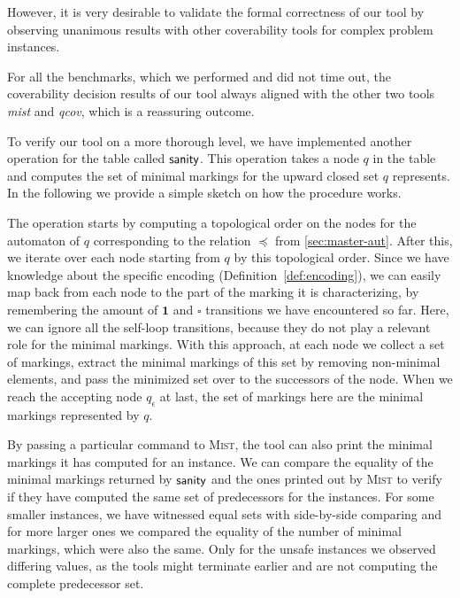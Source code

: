 However, it is very desirable to validate the formal correctness of our tool by observing unanimous results with other coverability tools for complex problem instances.

For all the benchmarks, which we performed and did not time out, the coverability decision results of our tool always aligned with the other two tools \textit{mist} and \textit{qcov}, which is a reassuring outcome. 

To verify our tool on a more thorough level, we have implemented another operation for the table called $\operatorname{\textsf{sanity}}$. This operation takes a node $q$ in the table and computes the set of minimal markings for the upward closed set $q$ represents. In the following we provide a simple sketch on how the procedure works.

The operation starts by computing a topological order on the nodes for the automaton of $q$ corresponding to the relation $\preceq$ from \autoref{sec:master-aut}. After this, we iterate over each node starting from $q$ by this topological order. Since we have knowledge about the specific encoding (Definition~\autoref{def:encoding}), we can easily map back from each node to the part of the marking it is characterizing, by remembering the amount of $\bm{1}$ and $\square$ transitions we have encountered so far. Here, we can ignore all the self-loop transitions, because they do not play a relevant role for the minimal markings.
With this approach, at each node we collect a set of markings, extract the minimal markings of this set by removing non-minimal elements, and pass the minimized set over to the successors of the node. When we reach the accepting node $q_{\epsilon}$ at last, the set of markings here are the minimal markings represented by $q$.

By passing a particular command to \textsc{Mist}, the tool can also print the minimal markings it has computed for an instance. We can compare the equality of the minimal markings returned by $\operatorname{\textsf{sanity}}$ and the ones printed out by \textsc{Mist} to verify if they have computed the same set of predecessors for the instances. For some smaller instances, we have witnessed equal sets with side-by-side comparing and for more larger ones we compared the equality of the number of minimal markings, which were also the same. Only for the unsafe instances we observed differing values, as the tools might terminate earlier and are not computing the complete predecessor set.